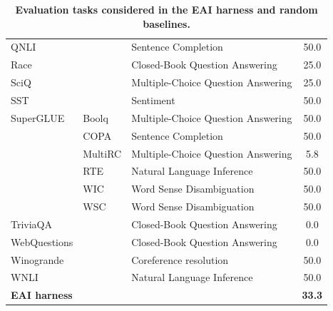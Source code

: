 \documentclass[11pt]{article}
\begin{document}
\begin{table}[h]
\begin{center}
\begin{tiny}
\begin{tabular}{lllc}
QNLI \citep{rajpurkar2016squad,wang2019glue}         & & Sentence Completion           & 50.0                                         \\
Race \cite{lai2017large}        & & Closed-Book Question Answering         & 25.0                       \\
SciQ \citep{welbl2017sciq}         & & Multiple-Choice Question Answering          & 25.0                                          \\
SST \citep{socher2013sst}         & & Sentiment          & 50.0                                                \\
SuperGLUE    & Boolq \citep{clark2019boolq} & Multiple-Choice Question Answering     & 50.0                     \\
             & COPA \citep{gordon2012copa} & Sentence Completion      & 50.0 \\
             & MultiRC \citep{kashabi2018multirc} & Multiple-Choice Question Answering   & 5.8                                          \\
             & RTE \citep{dagan2005rte} & Natural Language Inference       & 50.0                     \\
             & WIC  \citep{pilehavar2018wic} & Word Sense Disambiguation       & 50.0                     \\
             & WSC \citep{levesque2012winograd} & Word Sense Disambiguation      & 50.0                     \\
TriviaQA \citep{joshi2017triviaqa}     & & Closed-Book Question Answering          & 0.0                      \\
WebQuestions \citep{berant2013semantic} & & Closed-Book Question Answering         & 0.0                        \\
Winogrande \citep{sakaguchi2019winogrande}   & & Coreference resolution           & 50.0             \\
WNLI \citep{sakaguchi2019winogrande}        & & Natural Language Inference         & 50.0      \\ \midrule
\textbf{EAI harness} & & & \textbf{33.3} \\
\bottomrule
\end{tabular}
\end{tiny}
\end{center}
\caption{\textbf{Evaluation tasks considered in the EAI harness and random baselines.}}
\vskip -0.1in
\end{table}
\vfill
\newpage
\end{document}
